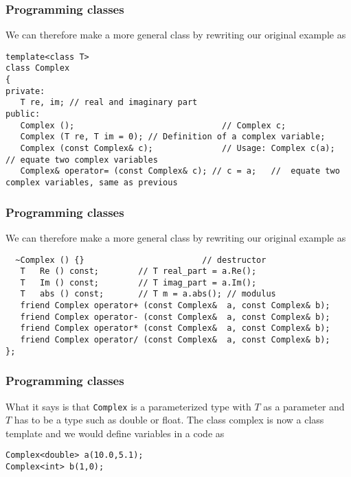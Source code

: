\documentclass{beamer}
\begin{document}
\begin{frame}
\frametitle{Programming classes}

We can therefore make a more general class by rewriting our original example as

\begin{verbatim}
template<class T>
class Complex
{
private:
   T re, im; // real and imaginary part
public:
   Complex ();                              // Complex c;
   Complex (T re, T im = 0); // Definition of a complex variable;
   Complex (const Complex& c);              // Usage: Complex c(a);   // equate two complex variables
   Complex& operator= (const Complex& c); // c = a;   //  equate two complex variables, same as previous

\end{verbatim}
\end{frame}

\begin{frame}
\frametitle{Programming classes}

We can therefore make a more general class by rewriting our original example as

\begin{verbatim}
  ~Complex () {}                        // destructor
   T   Re () const;        // T real_part = a.Re();
   T   Im () const;        // T imag_part = a.Im();
   T   abs () const;       // T m = a.abs(); // modulus
   friend Complex operator+ (const Complex&  a, const Complex& b);
   friend Complex operator- (const Complex&  a, const Complex& b);
   friend Complex operator* (const Complex&  a, const Complex& b);
   friend Complex operator/ (const Complex&  a, const Complex& b);
};
\end{verbatim}
\end{frame}

\begin{frame}
\frametitle{Programming classes}

What it says is that \Verb!Complex! is a parameterized type with $T$ as a parameter and $T$ has to be a type such as double
or float.
The class complex is now a class template
and we would define variables in a code as

\begin{verbatim}
Complex<double> a(10.0,5.1);
Complex<int> b(1,0);
\end{verbatim}
\end{frame}
\end{document}
